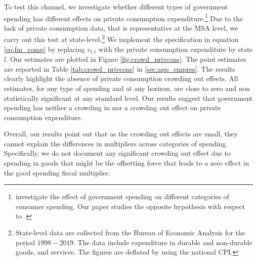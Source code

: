 \documentclass[dv_diss_main.tex]{subfiles}
\begin{document}

To test this channel, we investigate whether different types of government spending has different effects on private consumption expenditure.\footnote{\cite{Dupor2021} investigate the effect of government spending on different categories of consumer spending. Our paper studies the opposite hypothesis with respect to \cite{Dupor2021}.} Due to the lack of private consumption data, that is representative at the MSA level, we carry out this test at state-level.\footnote{State-level data are collected from the Bureau of Economic Analysis for the period $1998-2019$. The data include expenditure in durable and non-durable goods, and services. The figures are deflated by using the national CPI.} We implement the specification in equation \eqref{eq:fm_comp} by replacing $v_{l,t}$ with the private consumption expenditure by state $l$. Our estimates are plotted in Figure \ref{fig:crowd_privcons}. The point estimates are reported in Table \ref{tab:crowd_privcons} in \ref{sec:app_empres}. The results clearly highlight the absence of private consumption crowding out effects. All estimates, for any type of spending and at any horizon, are close to zero and non statistically significant at any standard level. Our results suggest that government spending has neither a crowding in nor a crowding out effect on private consumption expenditure.

Overall, our results point out that as the crowding out effects are small, they cannot explain the differences in multipliers across categories of spending. Specifically, we do not document any significant crowding out effect due to spending in goods that might be the offsetting force that leads to a zero effect in the good spending fiscal multiplier. 
\end{document}
